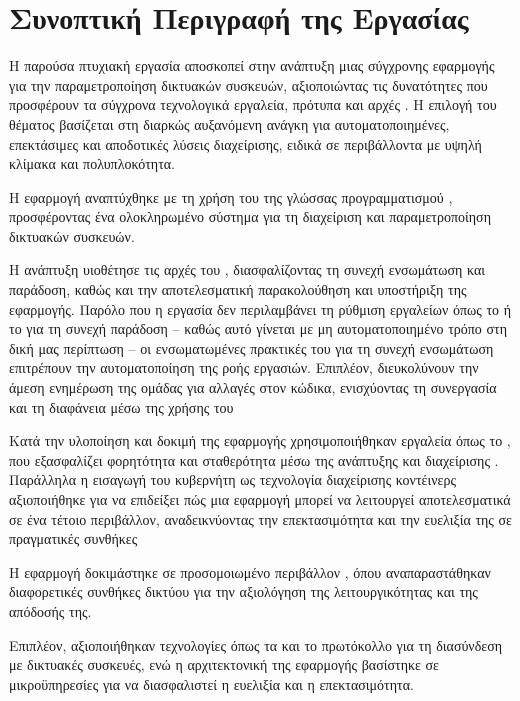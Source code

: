 \section{Συνοπτική Περιγραφή της Εργασίας}

Η παρούσα πτυχιακή εργασία αποσκοπεί στην ανάπτυξη μιας σύγχρονης 
εφαρμογής για την παραμετροποίηση δικτυακών συσκευών, αξιοποιώντας 
τις δυνατότητες που προσφέρουν τα σύγχρονα τεχνολογικά εργαλεία, 
πρότυπα και αρχές . 
Η επιλογή του θέματος βασίζεται στη διαρκώς αυξανόμενη ανάγκη 
για αυτοματοποιημένες, επεκτάσιμες και αποδοτικές λύσεις διαχείρισης, 
ειδικά σε περιβάλλοντα με υψηλή κλίμακα και πολυπλοκότητα.

Η εφαρμογή αναπτύχθηκε με τη χρήση του  της 
γλώσσας προγραμματισμού , προσφέροντας ένα ολοκληρωμένο  
σύστημα για τη διαχείριση και παραμετροποίηση δικτυακών συσκευών. 

Η ανάπτυξη υιοθέτησε τις αρχές του , 
διασφαλίζοντας τη συνεχή ενσωμάτωση και παράδοση, 
καθώς και την αποτελεσματική παρακολούθηση και 
υποστήριξη της εφαρμογής. Παρόλο που η εργασία δεν περιλαμβάνει τη 
ρύθμιση εργαλείων όπως το  ή το  
για τη συνεχή παράδοση – καθώς αυτό γίνεται με μη αυτοματοποιημένο τρόπο στη δική μας περίπτωση – 
οι ενσωματωμένες πρακτικές του  για τη συνεχή 
ενσωμάτωση επιτρέπουν την αυτοματοποίηση της ροής εργασιών. 
Επιπλέον, διευκολύνουν την άμεση ενημέρωση της ομάδας για αλλαγές 
στον κώδικα, ενισχύοντας τη συνεργασία και τη διαφάνεια μέσω της 
χρήσης του 

Κατά την υλοποίηση και δοκιμή της εφαρμογής χρησιμοποιήθηκαν εργαλεία όπως το , 
που εξασφαλίζει φορητότητα και σταθερότητα μέσω της ανάπτυξης και διαχείρισης . 
Παράλληλα η εισαγωγή του κυβερνήτη ως τεχνολογία διαχείρισης κοντέινερς αξιοποιήθηκε 
για να επιδείξει πώς μια εφαρμογή μπορεί να λειτουργεί αποτελεσματικά σε ένα τέτοιο περιβάλλον, 
αναδεικνύοντας την επεκτασιμότητα και την ευελιξία της σε πραγματικές συνθήκες

Η εφαρμογή δοκιμάστηκε σε προσομοιωμένο περιβάλλον , 
όπου αναπαραστάθηκαν διαφορετικές συνθήκες δικτύου για την 
αξιολόγηση της λειτουργικότητας και της απόδοσής της.

Επιπλέον, αξιοποιήθηκαν τεχνολογίες όπως τα  
και το πρωτόκολλο  για τη διασύνδεση με δικτυακές συσκευές, 
ενώ η αρχιτεκτονική της εφαρμογής βασίστηκε σε μικροϋπηρεσίες 
για να διασφαλιστεί η ευελιξία και η επεκτασιμότητα. 

